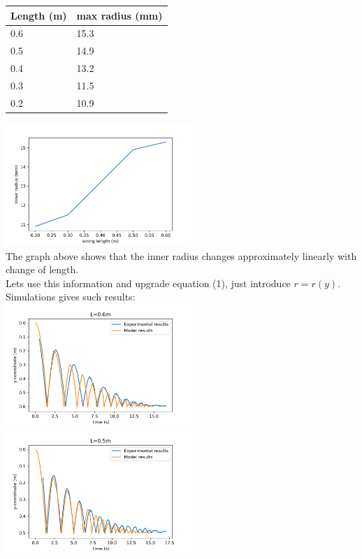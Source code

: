 \documentclass[a4paper,11pt,oneside,article]{memoir}
\begin{document}
\begin{center}
\begin{tabular}{ | m{5em} | m{5em}| } 
  \hline
   Length (m)& max radius (mm) \\ 
  \hline
   0.6 & 15.3 \\ 
  \hline
  0.5 & 14.9 \\ 
  \hline
  0.4 & 13.2 \\ 
  \hline
  0.3 & 11.5 \\ 
  \hline
  0.2 & 10.9 \\ 
  \hline
\end{tabular}
\end{center}
\includegraphics[width=7cm]{images/pic7.png}\\
The graph above shows that the inner radius changes approximately linearly with change of length.\\
Lets use this information and upgrade equation (1), just introduce $r=r(y)$.
Simulations gives such results:\\
\includegraphics[width=7cm]{images/pic8.png}
\includegraphics[width=7cm]{images/pic9.png}\\
\end{document}
